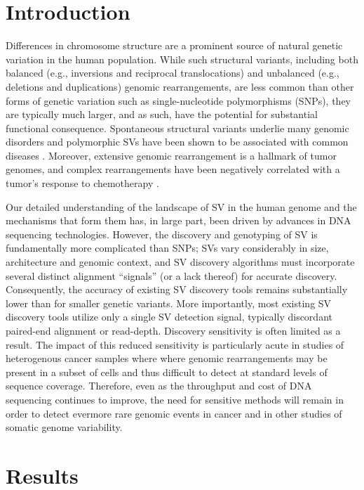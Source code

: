 \documentclass[11pt]{article}
\begin{document}
\section{Introduction}

Differences in chromosome structure are a prominent source of natural 
genetic variation in the human population. While such structural variants,
including both balanced (e.g., inversions and reciprocal translocations)
and unbalanced (e.g., deletions and duplications) genomic rearrangements, are 
less common than other forms of genetic variation such as single-nucleotide 
polymorphisms (SNPs), they are typically much larger, and as such, have the 
potential for substantial functional consequence. Spontaneous structural
variants underlie many genomic disorders and polymorphic SVs have been shown to
be associated with common diseases \cite{mccarroll2007}. Moreover, extensive
genomic rearrangement is a hallmark of tumor genomes, and complex rearrangements
have been negatively correlated with a tumor's response to chemotherapy
\cite{rausch2012a}.

Our detailed understanding of the landscape of SV in the human genome and the
mechanisms that form them has, in large part, been driven by advances in DNA
sequencing technologies. However, the discovery and genotyping of SV is 
fundamentally more complicated than SNPs; SVs vary considerably in size, 
architecture and genomic context, and SV discovery algorithms must incorporate 
several distinct alignment ``signals'' (or a lack thereof) for accurate 
discovery. Consequently, the accuracy of existing SV discovery tools remains 
substantially lower than for smaller genetic variants. More importantly, most 
existing SV discovery tools utilize only a single SV detection signal, typically
discordant paired-end alignment or read-depth. Discovery sensitivity is 
often limited as a result. The impact of this reduced sensitivity is 
particularly acute in studies of heterogenous cancer samples where where genomic 
rearrangements may be present in a subset of cells and thus difficult to 
detect at standard levels of sequence coverage. Therefore,
even as the throughput and cost of DNA sequencing continues to improve, the
need for sensitive methods will remain in order to detect evermore rare
genomic events in cancer and in other studies of somatic genome variability.



\section{Results}
\end{document}
